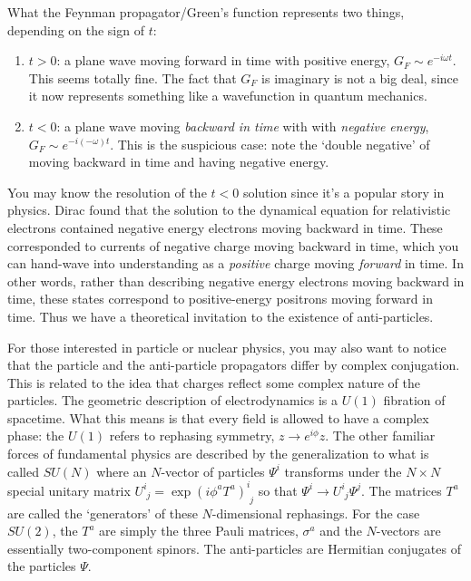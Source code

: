 What the Feynman propagator/Green's function represents two things, depending on the sign of $t$:
\begin{enumerate}
\item $t>0$: a plane wave moving forward in time with positive energy, $G_F \sim e^{-i\omega t}$. This seems totally fine. The fact that $G_F$ is imaginary is not a big deal, since it now represents something like a wavefunction in quantum mechanics. 
\item $t<0$: a plane wave moving \emph{backward in time} with  with \emph{negative energy}, $G_F \sim e^{-i(-\omega) t}$. This is the suspicious case: note the `double negative' of moving backward in time and having negative energy.
\end{enumerate}
You may know the resolution of the $t<0$ solution since it's a popular story in physics. Dirac found that the solution to the dynamical equation for relativistic electrons contained negative energy electrons moving backward in time. These corresponded to currents of negative charge moving backward in time, which you can hand-wave into understanding as a \emph{positive} charge moving \emph{forward} in time. In other words, rather than describing negative energy electrons moving backward in time, these states correspond to positive-energy positrons moving forward in time. Thus we have a theoretical invitation to the existence of anti-particles.

\begin{flipcomment}
For those interested in particle or nuclear physics, you may also want to notice that the particle and the anti-particle propagators differ by complex conjugation. This is related to the idea that charges reflect some complex nature of the particles. The geometric description of electrodynamics is a $U(1)$ fibration of spacetime. What this means is that every field is allowed to have a complex phase: the $U(1)$ refers to rephasing symmetry, $z\to e^{i\phi} z$. The other familiar forces of fundamental physics are described by the generalization to what is called $SU(N)$ where an $N$-vector of particles $\Psi^i$ transforms under the $N\times N$ special unitary matrix $U^i_{\phantom i j}=\exp(i\phi^a T^a)^i_{\phantom i j}$ so that $\Psi^i \to U^i_{\phantom i j} \Psi^j$. The matrices $T^a$ are called the `generators' of these $N$-dimensional rephasings. For the case $SU(2)$, the $T^a$ are simply the three Pauli matrices, $\sigma^a$ and the $N$-vectors are essentially two-component spinors. The anti-particles are Hermitian conjugates of the particles $\Psi$.
\end{flipcomment}


